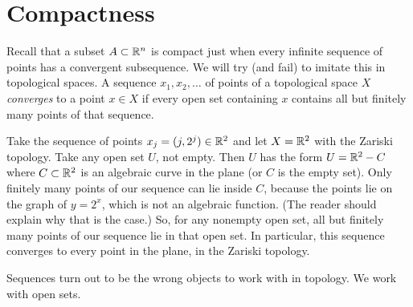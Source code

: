 \section{Compactness}
Recall that a subset \(A \subset \mathbb{R}^{n}\) is compact just when every infinite sequence of points has a convergent subsequence.
We will try (and fail) to imitate this in topological spaces.
A sequence \(x_1, x_2, \dots\) of points of a topological space \(X\) \emph{converges} to a point \(x \in X\) if every open set containing \(x\) contains all but finitely many points of that sequence.
\begin{example}
Take the sequence of points \(x_j=(j,2^j) \in \mathbb{R}^{2}\) and let \(X=\mathbb{R}^{2}\) with the Zariski topology.
Take any open set \(U\), not empty.
Then \(U\) has the form \(U=\mathbb{R}^{2} - C\) where \(C \subset \mathbb{R}^{2}\) is an algebraic curve in the plane (or \(C\) is the empty set).
Only finitely many points of our sequence can lie inside \(C\), because the points lie on the graph of \(y=2^x\), which is not an algebraic function.
(The reader should explain why that is the case.)
So, for any nonempty open set, all but finitely many points of our sequence lie in that open set.
In particular, this sequence converges to every point in the plane, in the Zariski topology.
\end{example}
Sequences turn out to be the wrong objects to work with in topology.
We work with open sets.

